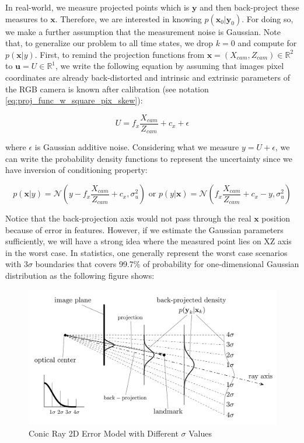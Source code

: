 \documentclass[a4paper]{report}
\numberwithin{figure}{section}
\newcommand{\R}{\mathbb{R}}
\begin{document}
In real-world, we measure projected points which is $\mathbf{y}$ and then 
back-project these measures to $\mathbf{x}$. Therefore, we are interested in 
knowing $p(\mathbf{x}_0|\mathbf{y}_0)$. For doing so, we make a further 
assumption that the measurement noise is Gaussian. Note that, to generalize our 
problem to all time states, we drop $k=0$ and compute for $p(\mathbf{x}|y)$. 
First, to remind the projection functions from $\mathbf{x}=(X_{cam},Z_{cam}) \in \R^2$ to 
$\mathbf{u}=U \in \R^1$, we write the following equation by assuming that 
images pixel coordinates are already back-distorted and 
intrinsic and extrinsic parameters of the RGB camera is known after calibration
(see notation \ref{eq:proj_func_w_square_pix_skew}):

\begin{equation}
  U = f_x \frac{X_{cam}}{Z_{cam}} + c_x + \epsilon
\end{equation}

where $\epsilon$ is Gaussian additive noise. Considering what we measure 
$y=U+\epsilon$, we can write the probability density functions
to represent the uncertainty since we have inversion of conditioning property:

\begin{equation}
  p(\mathbf{x}|y) = \mathcal{N}(y-f_x \frac{X_{cam}}{Z_{cam}} + c_x, \sigma_u^2) \text{ or }
  p(y|\mathbf{x}) = \mathcal{N}(f_x \frac{X_{cam}}{Z_{cam}} + c_x-y, \sigma_u^2)
\end{equation}

Notice that the back-projection axis would not pass 
through the real $\mathbf{x}$ position because of error in features. 
However, if we estimate the Gaussian 
parameters sufficiently, we will have a strong idea where the measured
point lies on XZ axis in the worst case. In statistics, one generally represent the 
worst case scenarios with $3\sigma$ boundaries that covers  99.7\% of probability
for one-dimensional Gaussian distribution as the following figure shows:

\begin{figure}[H]
	\centering
  \includegraphics[width=0.7\linewidth,natwidth=640,natheight=640]
  {fig/ref_imgs/conic_ray_2d_model_stds.png}
  \caption{Conic Ray 2D Error Model with Different $\sigma$ Values}
	\label{fig:conic_ray_2d_error_model_stds}
\end{figure}
\end{document}
